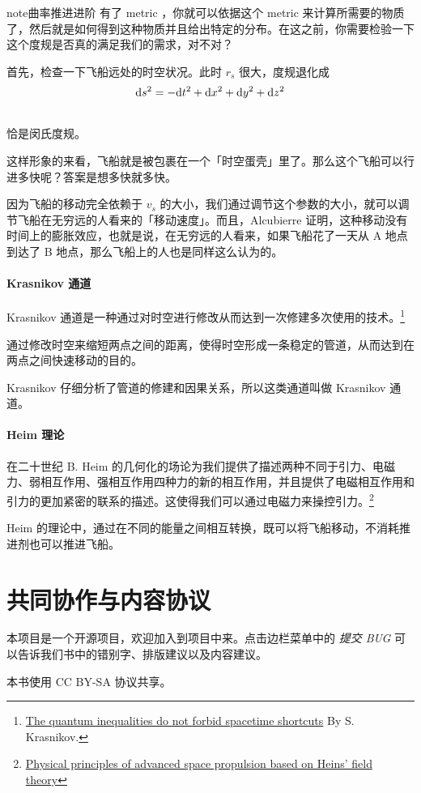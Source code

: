 \documentclass[letterpaper,10pt]{sphinxmanual}
\begin{document}
\begin{notice}{note}{曲率推进进阶}
有了 metric ，你就可以依据这个 metric 来计算所需要的物质了，然后就是如何得到这种物质并且给出特定的分布。在这之前，你需要检验一下这个度规是否真的满足我们的需求，对不对？

首先，检查一下飞船远处的时空状况。此时 $r_s$ 很大，度规退化成
\begin{gather}
\begin{split}\mathrm ds^2 = -\mathrm dt^2+\mathrm dx ^2 + \mathrm dy^2 + \mathrm dz^2\end{split}\notag\\\begin{split}\end{split}\notag
\end{gather}
恰是闵氏度规。

这样形象的来看，飞船就是被包裹在一个「时空蛋壳」里了。那么这个飞船可以行进多快呢？答案是想多快就多快。

因为飞船的移动完全依赖于 $v_s$ 的大小，我们通过调节这个参数的大小，就可以调节飞船在无穷远的人看来的「移动速度」。而且，Alcubierre 证明，这种移动没有时间上的膨胀效应，也就是说，在无穷远的人看来，如果飞船花了一天从 A 地点到达了 B 地点，那么飞船上的人也是同样这么认为的。
\end{notice}


\subsubsection{Krasnikov 通道}
\label{tech:krasnikov}\label{tech:index-11}
Krasnikov 通道是一种通过对时空进行修改从而达到一次修建多次使用的技术。\footnote{
\href{http://arxiv.org/abs/gr-qc/0207057}{The quantum inequalities do not forbid spacetime shortcuts} By S. Krasnikov.
}

通过修改时空来缩短两点之间的距离，使得时空形成一条稳定的管道，从而达到在两点之间快速移动的目的。

Krasnikov 仔细分析了管道的修建和因果关系，所以这类通道叫做 Krasnikov 通道。


\subsubsection{Heim 理论}
\label{tech:heim}\label{tech:index-12}
在二十世纪 B. Heim 的几何化的场论为我们提供了描述两种不同于引力、电磁力、弱相互作用、强相互作用四种力的新的相互作用，并且提供了电磁相互作用和引力的更加紧密的联系的描述。这使得我们可以通过电磁力来操控引力。\footnote{
\href{http://www.hpcc-space.com/publications/documents/PrinciplesOfAdvancedSpacePropulsionAIAA-paper-2002-4094.pdf}{Physical principles of advanced space propulsion based on Heins' field theory}
}

Heim 的理论中，通过在不同的能量之间相互转换，既可以将飞船移动，不消耗推进剂也可以推进飞船。


\chapter{共同协作与内容协议}
\label{index:id5}
本项目是一个开源项目，欢迎加入到项目中来。点击边栏菜单中的 \emph{提交 BUG} 可以告诉我们书中的错别字、排版建议以及内容建议。

本书使用 CC BY-SA 协议共享。



\renewcommand{\indexname}{索引}
\printindex
\end{document}
